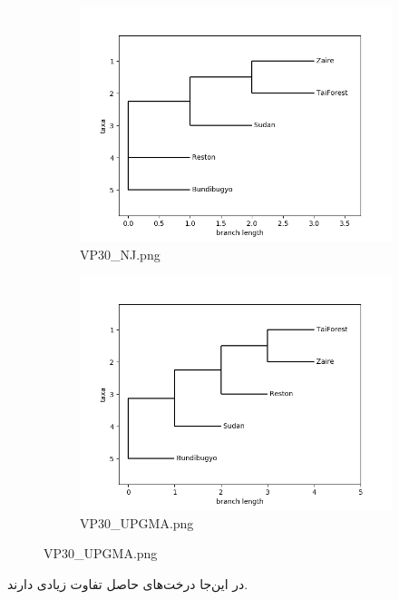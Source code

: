\documentclass[11pt]{article}
\begin{document}
\begin{figure}[H]
  \centering
  \begin{subfigure}[b]{0.4\linewidth}
    \includegraphics[width=\linewidth]{../Data/Trees/VP30_NJ.png}
    \caption{VP30\_NJ.png}
  \end{subfigure}
  \begin{subfigure}[b]{0.4\linewidth}
    \includegraphics[width=\linewidth]{../Data/Trees/VP30_UPGMA.png}
    \caption{VP30\_UPGMA.png}
  \end{subfigure}
\end{figure}
در این‌جا درخت‌های حاصل تفاوت زیادی دارند.
\end{document}
